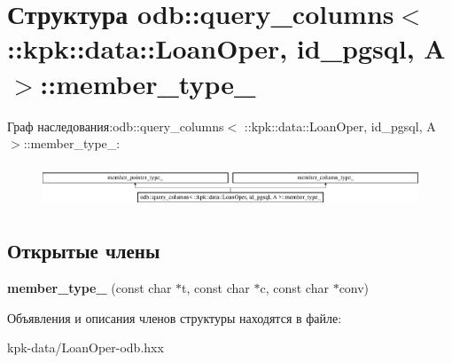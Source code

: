\hypertarget{structodb_1_1query__columns_3_01_1_1kpk_1_1data_1_1_loan_oper_00_01id__pgsql_00_01_a_01_4_1_1member__type__}{}\section{Структура odb\+:\+:query\+\_\+columns$<$ \+:\+:kpk\+:\+:data\+:\+:Loan\+Oper, id\+\_\+pgsql, A $>$\+:\+:member\+\_\+type\+\_\+}
\label{structodb_1_1query__columns_3_01_1_1kpk_1_1data_1_1_loan_oper_00_01id__pgsql_00_01_a_01_4_1_1member__type__}
Граф наследования\+:odb\+:\+:query\+\_\+columns$<$ \+:\+:kpk\+:\+:data\+:\+:Loan\+Oper, id\+\_\+pgsql, A $>$\+:\+:member\+\_\+type\+\_\+\+:\begin{figure}[H]
\begin{center}
\leavevmode
\includegraphics[height=1.287356cm]{structodb_1_1query__columns_3_01_1_1kpk_1_1data_1_1_loan_oper_00_01id__pgsql_00_01_a_01_4_1_1member__type__}
\end{center}
\end{figure}
\subsection*{Открытые члены}
\begin{DoxyCompactItemize}
\item 
{\bfseries member\+\_\+type\+\_\+} (const char $\ast$t, const char $\ast$c, const char $\ast$conv)\hypertarget{structodb_1_1query__columns_3_01_1_1kpk_1_1data_1_1_loan_oper_00_01id__pgsql_00_01_a_01_4_1_1member__type___a4c4234c2911fb9b59a3a2978120b4ace}{}\label{structodb_1_1query__columns_3_01_1_1kpk_1_1data_1_1_loan_oper_00_01id__pgsql_00_01_a_01_4_1_1member__type___a4c4234c2911fb9b59a3a2978120b4ace}

\end{DoxyCompactItemize}


Объявления и описания членов структуры находятся в файле\+:\begin{DoxyCompactItemize}
\item 
kpk-\/data/Loan\+Oper-\/odb.\+hxx\end{DoxyCompactItemize}
